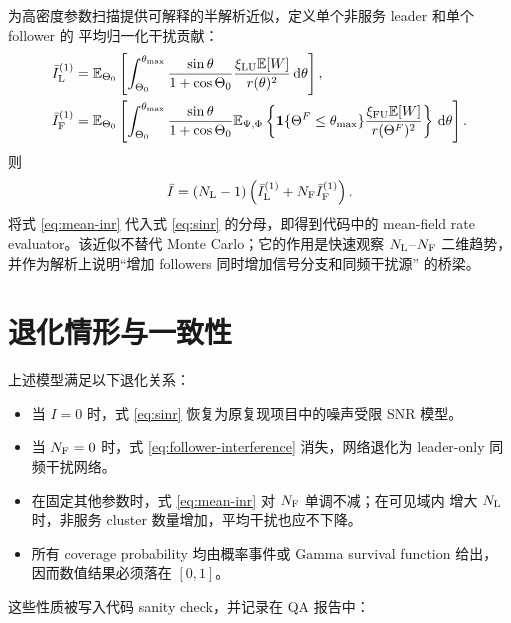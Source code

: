 \documentclass[UTF8,a4paper,11pt]{ctexart}
\newcommand{\thetam}{\theta_{\max}}
\newcommand{\NL}{N_{\rm L}}
\newcommand{\NF}{N_{\rm F}}
\newcommand{\E}{\mathbb{E}}
\newcommand{\dd}{\,{\rm d}}
\newcommand{\IT}{I}
\begin{document}
为高密度参数扫描提供可解释的半解析近似，定义单个非服务 leader 和单个 follower 的
平均归一化干扰贡献：
\begin{align}
    \bar I_{\rm L}^{(1)}
    &=
    \E_{\Theta_0}
    \left[
    \int_{\Theta_0}^{\thetam}
    \frac{\sin\theta}{1+\cos\Theta_0}
    \frac{\xi_{\rm LU}\E[W]}{r(\theta)^2}
    \dd\theta
    \right],\\
    \bar I_{\rm F}^{(1)}
    &=
    \E_{\Theta_0}
    \left[
    \int_{\Theta_0}^{\thetam}
    \frac{\sin\theta}{1+\cos\Theta_0}
    \E_{\Psi,\Phi}
    \left\{
    \mathbf{1}\{\Theta^F\leq\thetam\}
    \frac{\xi_{\rm FU}\E[W]}{r(\Theta^F)^2}
    \right\}
    \dd\theta
    \right].
\end{align}
则
\begin{equation}
    \bar I
    =
    (\NL-1)
    \left(
    \bar I_{\rm L}^{(1)}+\NF \bar I_{\rm F}^{(1)}
    \right).
    \label{eq:mean-inr}
\end{equation}
将式 \eqref{eq:mean-inr} 代入式 \eqref{eq:sinr} 的分母，即得到代码中的
mean-field rate evaluator。该近似不替代 Monte Carlo；它的作用是快速观察
$\NL$--$\NF$ 二维趋势，并作为解析上说明“增加 followers 同时增加信号分支和同频干扰源”
的桥梁。

\section{退化情形与一致性}

上述模型满足以下退化关系：
\begin{itemize}
    \item 当 $\IT=0$ 时，式 \eqref{eq:sinr} 恢复为原复现项目中的噪声受限 SNR 模型。
    \item 当 $\NF=0$ 时，式 \eqref{eq:follower-interference} 消失，网络退化为
    leader-only 同频干扰网络。
    \item 在固定其他参数时，式 \eqref{eq:mean-inr} 对 $\NF$ 单调不减；在可见域内
    增大 $\NL$ 时，非服务 cluster 数量增加，平均干扰也应不下降。
    \item 所有 coverage probability 均由概率事件或 Gamma survival function 给出，
    因而数值结果必须落在 $[0,1]$。
\end{itemize}
这些性质被写入代码 sanity check，并记录在 QA 报告中：
\begin{center}
    \\
\end{center}
\end{document}
